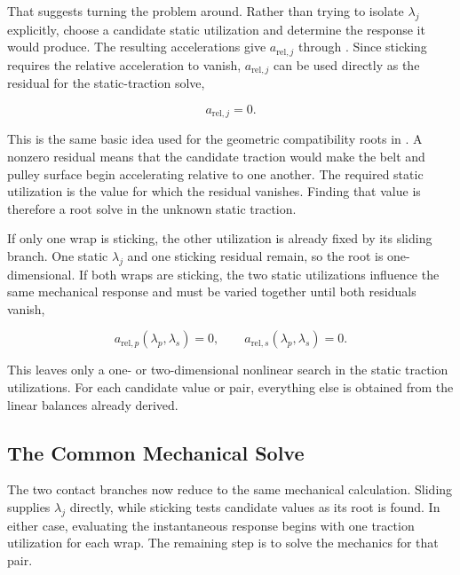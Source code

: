 \documentclass[11pt]{report}
\numberwithin{equation}{section}
\begin{document}
That suggests turning the problem around. Rather than trying to isolate
\(\lambda_j\) explicitly, choose a candidate static utilization and determine
the response it would produce. The resulting accelerations give
\(a_{\mathrm{rel},j}\) through
. Since sticking requires the
relative acceleration to vanish, \(a_{\mathrm{rel},j}\) can be used directly
as the residual for the static-traction solve,

\begin{equation}
    a_{\mathrm{rel},j}=0.
\label{eq:sticking_traction_root_condition}
\end{equation}

This is the same basic idea used for the geometric compatibility roots in
. A nonzero residual means that the candidate traction
would make the belt and pulley surface begin accelerating relative to one
another. The required static utilization is the value for which the residual
vanishes. Finding that value is therefore a root solve in the unknown static
traction.

If only one wrap is sticking, the other utilization is already fixed by its
sliding branch. One static \(\lambda_j\) and one sticking residual remain, so
the root is one-dimensional. If both wraps are sticking, the two static
utilizations influence the same mechanical response and must be varied
together until both residuals vanish,

\begin{equation}
    a_{\mathrm{rel},p}(\lambda_p,\lambda_s)=0,
    \qquad
    a_{\mathrm{rel},s}(\lambda_p,\lambda_s)=0.
\label{eq:stick_stick_root_condition}
\end{equation}

This leaves only a one- or two-dimensional nonlinear search in the static
traction utilizations. For each candidate value or pair, everything else is
obtained from the linear balances already derived.

\subsection{The Common Mechanical Solve}
\label{sec:engaged_mechanical_core}

The two contact branches now reduce to the same mechanical calculation.
Sliding supplies \(\lambda_j\) directly, while sticking tests candidate values
as its root is found. In either case, evaluating the instantaneous response
begins with one traction utilization for each wrap. The remaining step is to
solve the mechanics for that pair.
\end{document}
